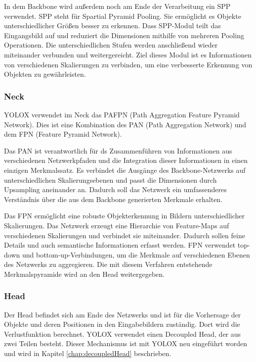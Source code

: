 In dem Backbone wird außerdem noch am Ende der Verarbeitung ein SPP verwendet. SPP steht für Spartial Pyramid Pooling. Sie ermöglicht es Objekte unterschiedlicher Größen besser zu erkennen. Dass SPP-Modul teilt das Eingangsbild auf und reduziert die Dimensionen mithilfe von mehreren Pooling Operationen. Die unterschiedlichen Stufen werden anschließend wieder miteinander verbunden und weitergereicht. Ziel dieses Modul ist es Informationen von verschiedenen Skalierungen zu verbinden, um eine verbesserte Erkennung von Objekten zu gewährleisten. \cite{yoloxBackbone}

\subsubsection{Neck}
YOLOX verwendet im Neck das PAFPN (Path Aggregation Feature Pyramid Network). Dies ist eine Kombination des PAN (Path Aggregation Network) und dem FPN (Feature Pyramid Network). 

Das PAN ist verantwortlich für ds Zusammenführen von Informationen aus verschiedenen Netzwerkpfaden und die Integration dieser Informationen in einen einzigen Merkmalssatz. Es verbindet die Ausgänge des Backbone-Netzwerks auf unterschiedlichen Skalierungsebenen und passt die Dimensionen durch Upsampling aneinander an. Dadurch soll das Netzwerk ein umfassenderes Verständnis über die aus dem Backbone generierten Merkmale erhalten.

Das FPN ermöglicht eine robuste Objekterkennung in Bildern unterschiedlicher Skalierungen. Das Netzwerk erzeugt eine Hierarchie von Feature-Maps auf verschiedenen Skalierungen und verbindet sie miteinander. Dadurch sollen feine Details und auch semantische Informationen erfasst werden. FPN verwendet top-down und bottom-up-Verbindungen, um die Merkmale auf verschiedenen Ebenen des Netzwerks zu aggregieren. Die mit diesem Verfahren entstehende Merkmalspyramide wird an den Head weitergegeben. \cite{yoloxNeckPAN, yoloxNeckFPN}


\subsubsection{Head}
Der Head befindet sich am Ende des Netzwerks und ist für die Vorhersage der Objekte und deren Positionen in den Eingabebildern zuständig. Dort wird die Verlustfunktion berechnet. YOLOX verwendet einen Decoupled Head, der aus zwei Teilen besteht. Dieser Mechanismus ist mit YOLOX neu eingeführt worden und wird in Kapitel \ref{chap:decoupledHead} beschrieben.


